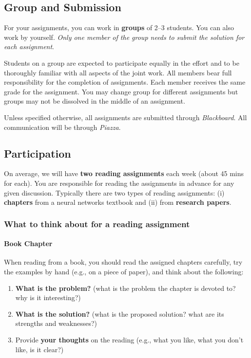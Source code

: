 \documentclass[11pt]{article}
\begin{document}
\subsection*{Group and Submission} 
For your assignments, you can work in \textbf{groups} of 2--3 students.  You can also work by yourself. \emph{Only one member of the group needs to submit the solution for each assignment}. 

Students on a group are expected to participate equally in the effort
    and to be thoroughly familiar with all aspects of the joint work.
    All members bear full responsibility for the completion of
    assignments. 
    Each member receives the same grade for the assignment.  You may change group for different assignments but groups may not be dissolved in the middle of an assignment.


Unless specified otherwise, all assignments are submitted through \emph{Blackboard}.  All communication will be through \emph{Piazza}.
\subsection{Participation}
\label{sec:org16c195f}

On average, we will have \textbf{\textbf{two reading assignments}} each week (about 45 mins for each). 
You are responsible for reading the assignments in advance for any given discussion.  Typically there are two types of reading assignments:  (i) \textbf{chapters} from a neural networks textbook and (ii) from \textbf{research papers}.  

\subsubsection{What to think about for a reading assignment}\label{sec:reading}
\paragraph{Book Chapter} When reading from a book, you should read the assigned chapters carefully, try the examples by hand (e.g., on a piece of paper), and think about the following:
\begin{enumerate}
    \item  \textbf{What is the problem?} (what is the problem the chapter is devoted to? why is it interesting?)
    \item \textbf{What is the solution?} (what is the proposed solution? what are its strengths and weaknesses?)
    \item  Provide \textbf{your thoughts} on the reading (e.g., what you like, what you don't like, is it clear?)

\end{enumerate}    
\end{document}
